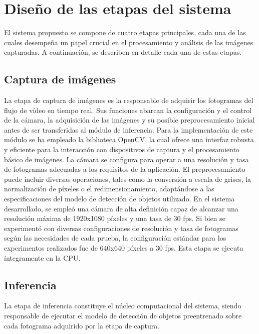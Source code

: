 \documentclass[11pt,spanish,listoffigures,listoftables]{tfgetsinf}
\begin{document}
\section{Diseño de las etapas del sistema} \label{sec:diseno_etapas}
 
El sistema propuesto se compone de cuatro etapas principales, cada una de las cuales desempeña un papel crucial en el procesamiento y análisis de las imágenes capturadas. A continuación, se describen en detalle cada una de estas etapas.

\subsection{Captura de imágenes} \label{sec:captura_imagenes}

La etapa de captura de imágenes es la responsable de adquirir los fotogramas del flujo de vídeo en tiempo real. Sus funciones abarcan la configuración y el control de la cámara, la adquisición de las imágenes y su posible preprocesamiento inicial antes de ser transferidas al módulo de inferencia. Para la implementación de este módulo se ha empleado la biblioteca OpenCV, la cual ofrece una interfaz robusta y eficiente para la interacción con dispositivos de captura y el procesamiento básico de imágenes. La cámara se configura para operar a una resolución y tasa de fotogramas adecuadas a los requisitos de la aplicación. El preprocesamiento puede incluir diversas operaciones, tales como la conversión a escala de grises, la normalización de píxeles o el redimensionamiento, adaptándose a las especificaciones del modelo de detección de objetos utilizado. En el sistema desarrollado, se empleó una cámara de alta definición capaz de alcanzar una resolución máxima de 1920x1080 píxeles y una tasa de 30 fps. Si bien se experimentó con diversas configuraciones de resolución y tasa de fotogramas según las necesidades de cada prueba, la configuración estándar para los experimentos realizados fue de 640x640 píxeles a 30 fps. Esta etapa se ejecuta íntegramente en la CPU.

\subsection{Inferencia} \label{sec:inferencia}
La etapa de inferencia constituye el núcleo computacional del sistema, siendo responsable de ejecutar el modelo de detección de objetos preentrenado sobre cada fotograma adquirido por la etapa de captura.
\end{document}
